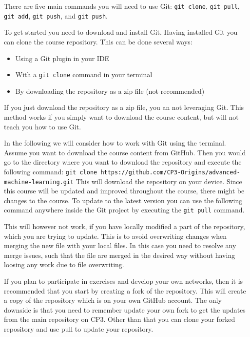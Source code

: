 \documentclass[12pt,a4paper]{article} %
\numberwithin{equation}{section}
\begin{document}
		There are five main commands you will need to use Git: \texttt{git clone}, \texttt{git pull}, \texttt{git add}, \texttt{git push}, and \texttt{git push}.
		
		To get started you need to download and install Git. Having installed Git you can clone the course repository. This can be done several ways:
		\begin{itemize}
			\item Using a Git plugin in your IDE
			\item With a \texttt{git clone} command in your terminal
			\item By downloading the repository as a zip file (not recommended)
		\end{itemize}
		If you just download the repository as a zip file, you an not leveraging Git. This method works if you simply want to download the course content, but will not teach you how to use Git.
		
		In the following we will consider how to work with Git using the terminal. Assume you want to download the course content from GitHub. Then you would go to the directory where you want to download the repository and execute the following command:\newline \newline
		\texttt{git clone https://github.com/CP3-Origins/advanced-machine-learning.git}
		\newline  \newline
		This will download the repository on your device. Since this course will be updated and improved throughout the course, there might be changes to the course. To update to the latest version you can use the following command anywhere inside the Git project by executing the \texttt{git pull} command.

		This will however not work, if you have locally modified a part of the repository, which you are trying to update. This is to avoid overwriting changes when merging the new file with your local files. In this case you need to resolve any merge issues, such that the file are merged in the desired way without having loosing any work due to file overwriting.
		
		If you plan to participate in exercises and develop your own networks, then it is recommended that you start by creating a fork of the repository. This will create a copy of the repository which is on your own GitHub account. The only downside is that you need to remember update your own fork to get the updates from the main repository on CP3. Other than that you can clone your forked repository and use pull to update your repository.
		
\end{document}

